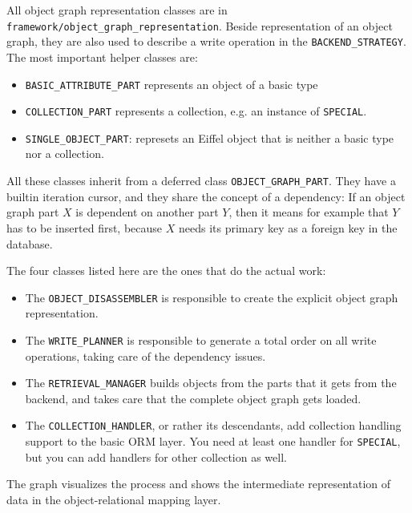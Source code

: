 All object graph representation classes are in \lstinline!framework/object_graph_representation!.
Beside representation of an object graph, they are also used to describe a write operation in the \lstinline!BACKEND_STRATEGY!.
The most important helper classes are:

\begin{itemize}
 \item \lstinline!BASIC_ATTRIBUTE_PART! represents an object of a basic type
 \item \lstinline!COLLECTION_PART! represents a collection, e.g. an instance of \lstinline!SPECIAL!.
 \item \lstinline!SINGLE_OBJECT_PART!: represets an Eiffel object that is neither a basic type nor a collection.
\end{itemize}

All these classes inherit from a deferred class \lstinline!OBJECT_GRAPH_PART!. 
They have a builtin iteration cursor, and they share the concept of a dependency:
If an object graph part $X$ is dependent on another part $Y$, then it means for example that $Y$ has to be inserted first, because $X$ needs its primary key as a foreign key in the database.

The four classes listed here are the ones that do the actual work:

\begin{itemize}
 \item The \lstinline!OBJECT_DISASSEMBLER! is responsible to create the explicit object graph representation.
 \item The \lstinline!WRITE_PLANNER! is responsible to generate a total order on all write operations, taking care of the dependency issues.
 \item The \lstinline!RETRIEVAL_MANAGER! builds objects from the parts that it gets from the backend, and takes care that the complete object graph gets loaded.
 \item The \lstinline!COLLECTION_HANDLER!, or rather its descendants, add collection handling support to the basic ORM layer. 
 You need at least one handler for \lstinline!SPECIAL!, but you can add handlers for other collection as well.
\end{itemize}

The graph visualizes the process and shows the intermediate representation of data in the object-relational mapping layer.


